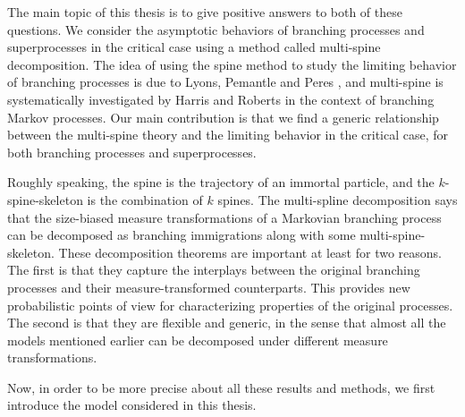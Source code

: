 \documentclass[UTF8]{pkuthss}
\theoremstyle{plain}
\theoremstyle{definition}
\numberwithin{equation}{section}
\begin{document}
    The main topic of this thesis is to give positive answers to both of these questions. We consider the asymptotic behaviors of branching processes and superprocesses in the critical case using a method called multi-spine decomposition. 
    The idea of using the spine method to study the limiting behavior of branching processes is due to Lyons, Pemantle and Peres \cite{LyonsPemantlePeres1995Conceptual}, and multi-spine is systematically investigated by Harris and Roberts \cite{HarrisRoberts2017The-many-to-few} in the context of branching Markov processes. 
    Our main contribution is that we find a generic relationship between the multi-spine theory and the limiting behavior in the critical case, for both branching processes and superprocesses.


    Roughly speaking, the spine is the trajectory of an immortal particle, and the $k$-spine-skeleton is the combination of $k$ spines.
    The multi-spline decomposition says that the size-biased measure transformations of a Markovian branching process can be decomposed as branching immigrations along with some multi-spine-skeleton.
    These decomposition theorems are important at least for two reasons. 
    The first is that they capture the interplays between the original branching processes and their measure-transformed counterparts. 
    This provides new probabilistic points of view for characterizing properties of the original processes.
    The second is that they are flexible and generic, in the sense that almost all the models mentioned earlier can be decomposed under different measure transformations. 

    Now, in order to be more precise about all these results and methods, we first introduce the model considered in this thesis.
\end{document}
